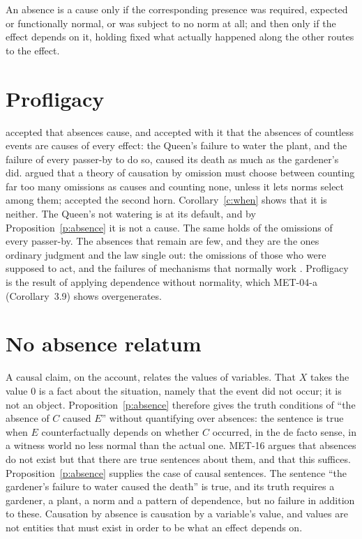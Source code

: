 \documentclass{situationist-preprint}
\begin{document}
\begin{corollary}\label{c:when}
An absence is a cause only if the corresponding presence was required, expected or functionally normal, or was subject to no norm at all; and then only if the effect depends on it, holding fixed what actually happened along the other routes to the effect.
\end{corollary}

\section{Profligacy}

\citet{Lewis2004} accepted that absences cause, and accepted with it that the absences of countless events are causes of every effect: the Queen's failure to water the plant, and the failure of every passer-by to do so, caused its death as much as the gardener's did. \citet{McGrath2005} argued that a theory of causation by omission must choose between counting far too many omissions as causes and counting none, unless it lets norms select among them; \citet{Beebee2004} accepted the second horn. Corollary~\ref{c:when} shows that it is neither. The Queen's not watering is at its default, and by Proposition~\ref{p:absence} it is not a cause. The same holds of the omissions of every passer-by. The absences that remain are few, and they are the ones ordinary judgment and the law single out: the omissions of those who were supposed to act, and the failures of mechanisms that normally work \citep{HartHonore1985}. Profligacy is the result of applying dependence without normality, which MET-04-a (Corollary~3.9) shows overgenerates.

\section{No absence relatum}

A causal claim, on the account, relates the values of variables. That $X$ takes the value $0$ is a fact about the situation, namely that the event did not occur; it is not an object. Proposition~\ref{p:absence} therefore gives the truth conditions of \enquote{the absence of $C$ caused $E$} without quantifying over absences: the sentence is true when $E$ counterfactually depends on whether $C$ occurred, in the de facto sense, in a witness world no less normal than the actual one. MET-16 argues that absences do not exist but that there are true sentences about them, and that this suffices. Proposition~\ref{p:absence} supplies the case of causal sentences. The sentence \enquote{the gardener's failure to water caused the death} is true, and its truth requires a gardener, a plant, a norm and a pattern of dependence, but no failure in addition to these. Causation by absence is causation by a variable's value, and values are not entities that must exist in order to be what an effect depends on.
\end{document}

